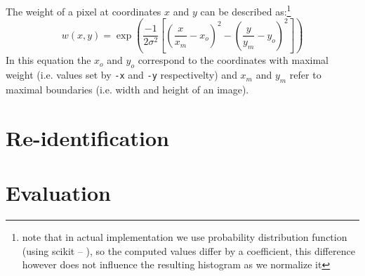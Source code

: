The weight of a pixel at coordinates $x$ and $y$ can be described as:\footnote{note that 
in actual implementation we use probability distribution function (using scikit -- 
\cite{scipy}), so the computed values differ by a coefficient, this difference however 
does not influence the resulting histogram as we normalize it}
$$w(x,y) = \exp\left(\frac{-1}{2\sigma^2} \left[\left(\frac{x}{x_m}-x_o\right)^2 - \left(\frac{y}{y_m}-y_o\right)^2 \right]\right)$$
In this equation the $x_o$ and $y_o$ correspond to the coordinates with maximal
weight (i.e. values set by \verb+-x+ and \verb+-y+ respectivelty) and $x_m$ and $y_m$
refer to maximal boundaries (i.e. width and height of an image).
\chapter{Re-identification}
\label{ch:reidentification}


\chapter{Evaluation}
\label{ch:evaluation}
